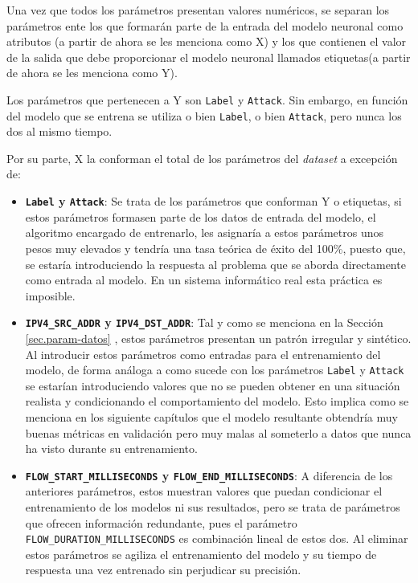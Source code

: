 Una vez que todos los parámetros presentan valores numéricos, se separan los parámetros ente los que formarán parte de la entrada del modelo neuronal como atributos (a partir de ahora se les menciona como X) y los que contienen el valor de la salida que debe proporcionar el modelo neuronal llamados etiquetas(a partir de ahora se les menciona como Y).

Los parámetros que pertenecen a Y son \texttt{Label} y \texttt{Attack}. Sin embargo, en función del modelo que se entrena se utiliza o bien \texttt{Label}, o bien \texttt{Attack}, pero nunca los dos al mismo tiempo.

Por su parte, X la conforman el total de los parámetros del \textit{dataset} a excepción de:
\begin{itemize}
	\item \textbf{\texttt{Label} y \texttt{Attack}}: Se trata de los parámetros que conforman Y o etiquetas, si estos parámetros formasen parte de los datos de entrada del modelo, el algoritmo encargado de entrenarlo, les asignaría a estos parámetros unos pesos muy elevados y tendría una tasa teórica de éxito del 100\%, puesto que, se estaría introduciendo la respuesta al problema que se aborda directamente como entrada al modelo. En un sistema informático real esta práctica es imposible.
	\item \textbf{\texttt{IPV4\_SRC\_ADDR} y \texttt{IPV4\_DST\_ADDR}}: Tal y como se menciona en la Sección \ref{sec.param-datos} , estos parámetros presentan un patrón irregular y sintético. Al introducir estos parámetros como entradas para el entrenamiento del modelo, de forma análoga a como sucede con los parámetros \texttt{Label} y \texttt{Attack} se estarían introduciendo valores que no se pueden obtener en una situación realista y condicionando el comportamiento del modelo. Esto implica como se menciona en los siguiente capítulos que el modelo resultante obtendría muy buenas métricas en validación pero muy malas al someterlo a datos que nunca ha visto durante su entrenamiento.
	\item \textbf{\texttt{FLOW\_START\_MILLISECONDS} y \texttt{FLOW\_END\_MILLISECONDS}}: A diferencia de los anteriores parámetros, estos muestran valores que puedan condicionar el entrenamiento de los modelos ni sus resultados, pero se trata de parámetros que ofrecen información redundante, pues el parámetro \texttt{FLOW\_DURATION\_MILLISECONDS} es combinación lineal de estos dos. Al eliminar estos parámetros se agiliza el entrenamiento del modelo y su tiempo de respuesta una vez entrenado sin perjudicar su precisión.
\end{itemize}

